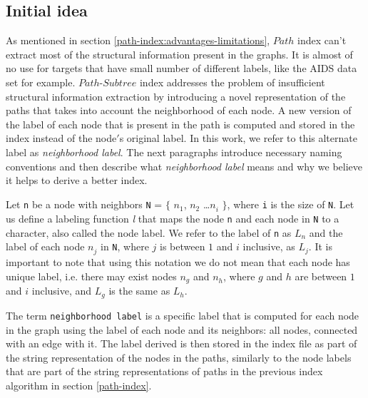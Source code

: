 \documentclass{l4proj}
\newcounter{example}[section]
\begin{document}
\subsection{Initial idea}
As mentioned in section \ref{path-index:advantages-limitations}, $Path$ index can't extract most of the structural information present in the graphs. It is almost of no use for targets that have small number of different labels, like the AIDS data set for example. $Path$-$Subtree$ index addresses the problem of insufficient structural information extraction by introducing a novel representation of the paths that takes into account the neighborhood of each node. A new version of the label of each node that is present in the path is computed and stored in the index instead of the node$'$s original label. In this work, we refer to this alternate label as \textit{neighborhood label}. The next paragraphs introduce necessary naming conventions and then describe what \textit{neighborhood label} means and why we believe it helps to derive a better index.\par %
Let \texttt{n} be a node with neighbors \texttt{N} = $\{$ $n^{}_1$, $n^{}_2$ \ldots $n^{}_i$ $\}$, where \texttt{i} is the size of \texttt{N}. Let us define a labeling function \textit{l} that maps the node \texttt{n} and each node in \texttt{N} to a character, also called the node label. We refer to the label of \texttt{n} as \texttt{$L^{}_n$} and the label of each node $n^{}_j$ in \texttt{N}, where $j$ is between $1$ and $i$ inclusive, as \texttt{$L^{}_j$}. It is important to note that using this notation we do not mean that each node has unique label, i.e. there may exist nodes $n^{}_g$ and $n^{}_h$, where $g$ and $h$ are between $1$ and $i$ inclusive, and \texttt{$L^{}_g$} is the same as \texttt{$L^{}_h$}.\par %
The term \texttt{neighborhood label} is a specific label that is computed for each node in the graph using the label of each node and its neighbors: all nodes, connected with an edge with it. The label derived is then stored in the index file as part of the string representation of the nodes in the paths, similarly to the node labels that are part of the string representations of paths in the previous index algorithm in section \ref{path-index}.\par
\end{document}
